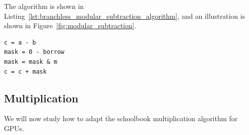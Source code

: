 \documentclass[12pt, a4paper]{report}
\begin{document}
The algorithm is shown in
Listing~\ref{lst:branchless_modular_subtraction_algorithm}, and an illustration
is shown in Figure~\ref{fig:modular_subtraction}.

\begin{lstlisting}
c = a - b
mask = 0 - borrow
mask = mask & m
c = c + mask
\end{lstlisting}

\subsection{Multiplication}
We will now study how to adapt the schoolbook multiplication algorithm for
GPUs.
\begin{figure}
        \centering
        \begin{subfigure}[h]{0.5\textwidth}
                \centering

\end{subfigure}
\end{figure}
\end{document}
